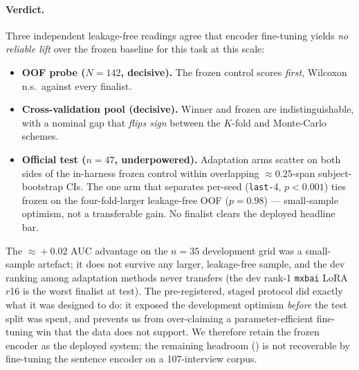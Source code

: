\paragraph{Verdict.} Three independent leakage-free readings agree that encoder
fine-tuning yields \emph{no reliable lift} over the frozen baseline for this task at
this scale:
\begin{itemize}
  \item \textbf{OOF probe ($N\!=\!142$, decisive).} The frozen control scores
        \emph{first}, Wilcoxon n.s.\ against every finalist.
  \item \textbf{Cross-validation pool (decisive).} Winner and frozen are
        indistinguishable, with a nominal gap that \emph{flips sign} between the
        $K$-fold and Monte-Carlo schemes.
  \item \textbf{Official test ($n\!=\!47$, underpowered).} Adaptation arms scatter
        on both sides of the in-harness frozen control within overlapping
        $\approx\!0.25$-span subject-bootstrap CIs. The one arm that separates
        per-seed (\texttt{last-}4, $p<0.001$) ties frozen on the four-fold-larger
        leakage-free OOF ($p=0.98$) --- small-sample optimism, not a transferable
        gain. No finalist clears the deployed headline bar.
\end{itemize}
The $\approx\!+0.02$ AUC advantage on the $n\!=\!35$ development grid was a
small-sample artefact; it does not survive any larger, leakage-free sample, and the
dev ranking among adaptation methods never transfers (the dev rank-1 \texttt{mxbai}
LoRA $r$16 is the worst finalist at test). The pre-registered, staged protocol did
exactly what it was designed to do: it exposed the development optimism \emph{before}
the test split was spent, and prevents us from over-claiming a parameter-efficient
fine-tuning win that the data does not support. We therefore retain the frozen
encoder as the deployed system; the remaining headroom () is not
recoverable by fine-tuning the sentence encoder on a 107-interview corpus.
